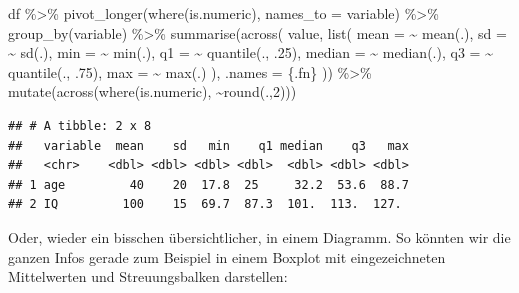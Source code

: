 \documentclass[
]{book}
\newenvironment{Shaded}{\begin{snugshade}}{\end{snugshade}}
\newcommand{\AttributeTok}[1]{\textcolor[rgb]{0.77,0.63,0.00}{#1}}
\newcommand{\DecValTok}[1]{\textcolor[rgb]{0.00,0.00,0.81}{#1}}
\newcommand{\FunctionTok}[1]{\textcolor[rgb]{0.00,0.00,0.00}{#1}}
\newcommand{\NormalTok}[1]{#1}
\newcommand{\SpecialCharTok}[1]{\textcolor[rgb]{0.00,0.00,0.00}{#1}}
\newcommand{\StringTok}[1]{\textcolor[rgb]{0.31,0.60,0.02}{#1}}
\begin{document}
\begin{Shaded}
\begin{Highlighting}[]
\NormalTok{df }\SpecialCharTok{\%\textgreater{}\%} 
  \FunctionTok{pivot\_longer}\NormalTok{(}\FunctionTok{where}\NormalTok{(is.numeric),}
               \AttributeTok{names\_to =} \StringTok{\textquotesingle{}variable\textquotesingle{}}\NormalTok{) }\SpecialCharTok{\%\textgreater{}\%} 
  \FunctionTok{group\_by}\NormalTok{(variable) }\SpecialCharTok{\%\textgreater{}\%} 
  \FunctionTok{summarise}\NormalTok{(}\FunctionTok{across}\NormalTok{(}
\NormalTok{    value,}
    \FunctionTok{list}\NormalTok{(}
      \AttributeTok{mean =} \SpecialCharTok{\textasciitilde{}} \FunctionTok{mean}\NormalTok{(.),}
      \AttributeTok{sd =} \SpecialCharTok{\textasciitilde{}} \FunctionTok{sd}\NormalTok{(.),}
      \AttributeTok{min =} \SpecialCharTok{\textasciitilde{}} \FunctionTok{min}\NormalTok{(.),}
      \AttributeTok{q1 =} \SpecialCharTok{\textasciitilde{}} \FunctionTok{quantile}\NormalTok{(., .}\DecValTok{25}\NormalTok{),}
      \AttributeTok{median =} \SpecialCharTok{\textasciitilde{}} \FunctionTok{median}\NormalTok{(.),}
      \AttributeTok{q3 =} \SpecialCharTok{\textasciitilde{}} \FunctionTok{quantile}\NormalTok{(., .}\DecValTok{75}\NormalTok{),}
      \AttributeTok{max =} \SpecialCharTok{\textasciitilde{}} \FunctionTok{max}\NormalTok{(.)}
\NormalTok{    ),}
    \AttributeTok{.names =} \StringTok{\textquotesingle{}\{.fn\}\textquotesingle{}}
\NormalTok{  )) }\SpecialCharTok{\%\textgreater{}\%} 
  \FunctionTok{mutate}\NormalTok{(}\FunctionTok{across}\NormalTok{(}\FunctionTok{where}\NormalTok{(is.numeric),}
                \SpecialCharTok{\textasciitilde{}}\FunctionTok{round}\NormalTok{(.,}\DecValTok{2}\NormalTok{)))}
\end{Highlighting}
\end{Shaded}

\begin{verbatim}
## # A tibble: 2 x 8
##   variable  mean    sd   min    q1 median    q3   max
##   <chr>    <dbl> <dbl> <dbl> <dbl>  <dbl> <dbl> <dbl>
## 1 age         40    20  17.8  25     32.2  53.6  88.7
## 2 IQ         100    15  69.7  87.3  101.  113.  127.
\end{verbatim}

Oder, wieder ein bisschen übersichtlicher, in einem Diagramm. So könnten wir die ganzen Infos gerade zum Beispiel in einem Boxplot mit eingezeichneten Mittelwerten und Streuungsbalken darstellen:
\end{document}

